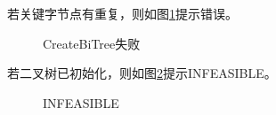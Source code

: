 \documentclass[supercite]{Experimental_Report}
\theoremstyle{definition}
\begin{document}
\noindent
若关键字节点有重复，则如图\ref{fig5-4}提示错误。
\begin{figure}[htbp]
	\centering
	\centering
	\caption{CreateBiTree失败}
	\label{fig5-4}
\end{figure}

\noindent
若二叉树已初始化，则如图\ref{fig5-5}提示INFEASIBLE。
\begin{figure}[htbp]
	\centering
	\centering
	\caption{INFEASIBLE}
	\label{fig5-5}
\end{figure}
\end{document}
